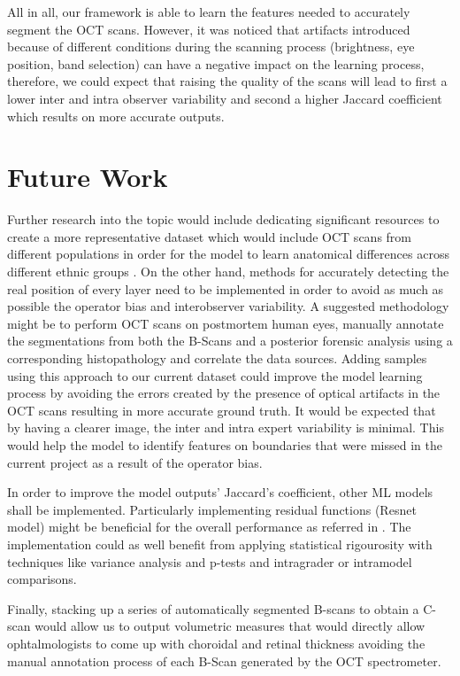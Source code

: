 \documentclass[12pt,a4paper]{scrartcl}
\begin{document}
All in all, our framework is able to learn the features needed to accurately segment the OCT scans. However, it was noticed that artifacts introduced because of different conditions during the scanning process (brightness, eye position, band selection) can have a negative impact on the learning process, therefore, we could expect that raising the quality of the scans will lead to first a lower inter and intra observer variability and second a higher Jaccard coefficient which results on more accurate outputs.



\section{Future Work}

Further research into the topic would include dedicating significant resources to create a more representative dataset which would include OCT scans from different populations in order for the model to learn anatomical differences across different ethnic groups \cite{Consejo2020, Lin2009}. On the other hand, methods for accurately detecting the real position of every layer need to be implemented in order to avoid as much as possible the operator bias and interobserver variability. A suggested methodology might be to perform OCT scans on postmortem human eyes, manually annotate the segmentations from both the B-Scans and a posterior forensic analysis using a corresponding histopathology \cite{IOVINO2017, Mcnabb2009, Nioi2019} and correlate the data sources. Adding samples using this approach to our current dataset could improve the model learning process by avoiding the errors created by the presence of optical artifacts in the OCT scans resulting in more accurate ground truth. It would be expected that by having a clearer image, the inter and intra expert variability is minimal. This would help the model to identify features on boundaries that were missed in the current project as a result of the operator bias.

In order to improve the model outputs' Jaccard's coefficient, other ML models shall be implemented. Particularly implementing residual functions (Resnet model) might be beneficial for the overall performance as referred in \cite{He2015, Zheng2020}. The implementation could as well benefit from applying statistical rigourosity with techniques like variance analysis and p-tests and intragrader or intramodel comparisons. 

Finally, stacking up a series of automatically segmented B-scans to obtain a C-scan would allow us to output volumetric measures that would directly allow ophtalmologists to come up with choroidal and retinal thickness avoiding the manual annotation process of each B-Scan generated by the OCT spectrometer. 
\end{document}
